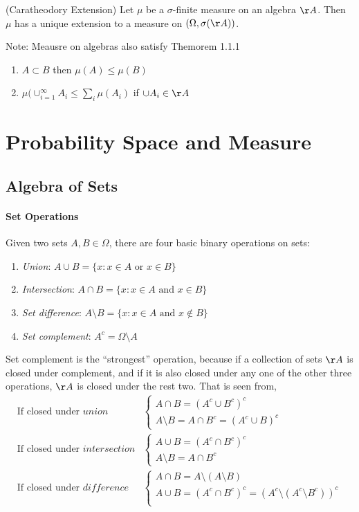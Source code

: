 \documentclass{memoir}
\begin{document}
\begin{thm}
	(Caratheodory Extension) Let $\mu$ be a $\sigma$-finite measure on an algebra $\AA$. Then $\mu$ has a unique extension to a measure on $(\Omega, \sigma(\AA))$.
\end{thm}

Note: Meausre on algebras also satisfy Themorem 1.1.1
\begin{enumerate}
	\item $A \subset B$ then $\mu(A) \le \mu(B)$
	\item $\mu(\cup_{i=1}^\infty A_i \le \sum_i \mu(A_i)$ if $\cup A_i \in \AA$
\end{enumerate}


\chapter{Probability Space and Measure}

\section{Algebra of Sets}

\subsubsection{Set Operations}
Given two sets $A, B \in \Omega$, there are four basic binary operations on sets:
\begin{enumerate}
	\item {\em{Union}}: $A \cup B = \{x: x \in A \mbox{ or } x \in B\}$
	\item {\em{Intersection}}: $A \cap B = \{x: x \in A \mbox{ and } x \in B\}$
	\item {\em{Set difference}}: $A \setminus B = \{x: x \in A \mbox{ and } x \notin B\}$
	\item {\em{Set complement}}: $A^c = \Omega \setminus A$
\end{enumerate}

Set complement is the ``strongest'' operation, because if a collection of sets $\AA$ is closed under complement, and if it is also closed under any one of the other three operations, $\AA$ is closed under the rest two. That is seen from,
\begin{align}
	\mbox{If closed under } union &
	\begin{cases}
		A \cap B = (A^c \cup B^c)^c\\
		A \setminus B = A \cap B^c = (A^c \cup B)^c
	\end{cases}	
	\\
	\mbox{If closed under } intersection &
	\begin{cases}
		A \cup B = (A^c \cap B^c)^c\\		
		A \setminus B = A \cap B^c
	\end{cases}
	\\
	\mbox{If closed under } difference &
	\begin{cases}
		A \cap B = A \setminus (A \setminus B)\\
		A \cup B = (A^c \cap B^c)^c = (A^c \setminus (A^c \setminus B^c))^c\\
	\end{cases}		
\end{align}
\end{document}
